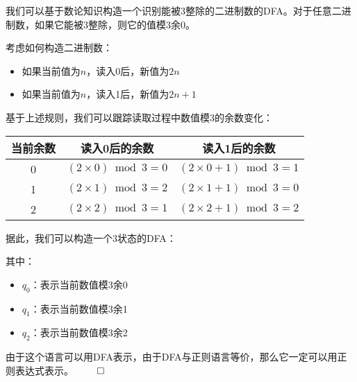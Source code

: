 \documentclass[UTF8]{report}
\renewenvironment{proof}{{\setlength{\parskip}{7pt}\noindent\hskip 2em \bf 证明 \quad}}{\hfill$\qed$\par}
\begin{document}
\begin{proof}

我们可以基于数论知识构造一个识别能被3整除的二进制数的DFA。对于任意二进制数，如果它能被3整除，则它的值模3余0。

考虑如何构造二进制数：
\begin{itemize}
    \item 如果当前值为$n$，读入0后，新值为$2n$
    \item 如果当前值为$n$，读入1后，新值为$2n+1$
\end{itemize}

基于上述规则，我们可以跟踪读取过程中数值模3的余数变化：

\begin{center}
\begin{tabular}{|c|c|c|}
    \hline
    当前余数 & 读入0后的余数 & 读入1后的余数 \\
    \hline
    0 & $(2 \times 0) \bmod 3 = 0$ & $(2 \times 0 + 1) \bmod 3 = 1$ \\
    \hline
    1 & $(2 \times 1) \bmod 3 = 2$ & $(2 \times 1 + 1) \bmod 3 = 0$ \\
    \hline
    2 & $(2 \times 2) \bmod 3 = 1$ & $(2 \times 2 + 1) \bmod 3 = 2$ \\
    \hline
\end{tabular}
\end{center}

据此，我们可以构造一个3状态的DFA：
\begin{figure}[H]
    \centering
\end{figure}

其中：
\begin{itemize}
    \item $q_0$：表示当前数值模3余0
    \item $q_1$：表示当前数值模3余1
    \item $q_2$：表示当前数值模3余2
\end{itemize}

由于这个语言可以用DFA表示，由于DFA与正则语言等价，那么它一定可以用正则表达式表示。
\end{proof}
\end{document}
